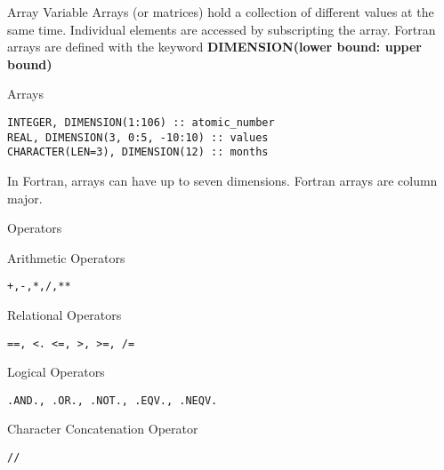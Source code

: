 \begin{frame}[fragile]{Array Variable}
Arrays (or matrices) hold a collection of different values at the
same time. Individual elements are accessed by subscripting the array.
Fortran arrays are defined with the keyword \textbf{DIMENSION(lower bound: upper bound)} 
\begin{block}{Arrays}
\begin{lstlisting}
INTEGER, DIMENSION(1:106) :: atomic_number
REAL, DIMENSION(3, 0:5, -10:10) :: values
CHARACTER(LEN=3), DIMENSION(12) :: months
\end{lstlisting}
\end{block}
In Fortran, arrays can have up to seven dimensions. Fortran arrays are column major.
\end{frame}


\begin{frame}[fragile]{Operators}
\begin{block}{Arithmetic Operators}
\begin{lstlisting}
+,-,*,/,**
\end{lstlisting}
\end{block}
\begin{block}{Relational Operators}
\begin{lstlisting}
==, <. <=, >, >=, /=
\end{lstlisting}
\end{block}
\begin{block}{Logical Operators}
\begin{lstlisting}
.AND., .OR., .NOT., .EQV., .NEQV.
\end{lstlisting}
\end{block}
\begin{block}{Character Concatenation Operator}
\begin{lstlisting}
//
\end{lstlisting}
\end{block}
\end{frame}


